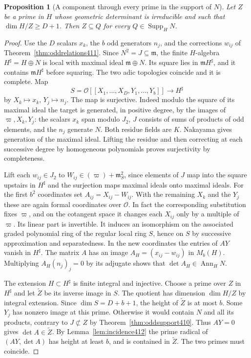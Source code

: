 \documentclass[a4paper,11pt]{article}
\newtheorem{proposition}{Proposition}[section]
\theoremstyle{definition}
\theoremstyle{remark}
\numberwithin{equation}{section}
\begin{document}
\begin{proposition}[A component through every prime in the support of \(N\)]\leavevmode
\label{prop:localcomponent412}
Let \(Z\) be a prime in \(H\) whose geometric determinant is
irreducible and such that \(\dim H/Z\ge D+1\). Then
\(Z\subseteq Q\) for every \(Q\in\operatorname{Supp}_H N\).
\end{proposition}
\begin{proof}
Use the \(D\) scalars \(x_k\), the \(b\) odd generators
\(n_j\), and the corrections \(w_{ij}\) of
Theorem~\ref{thm:oddrelations411}. Since \(N^2=J\subseteq
\mathfrak m\), the finite \(H\)-algebra \(H^\sharp=H\oplus N\)
is local with maximal ideal \(\mathfrak m\oplus N\). Its
square lies in \(\mathfrak m H^\sharp\), and it contains
\(\mathfrak m H^\sharp\) before squaring. The two adic
topologies coincide and it is complete. Map
\[
       S=\mathcal O[[X_1,\ldots,X_D,Y_1,\ldots,Y_b]]
                 \longrightarrow H^\sharp
\]
by \(X_k\mapsto x_k\), \(Y_j\mapsto n_j\). The map is
surjective. Indeed modulo the square of its maximal ideal
the target is generated, in positive degree, by the images
of \(\varpi,X_k,Y_j\): the scalars \(x_k\) span modulo
\(J_2\), \(J\) consists of sums of products of odd elements,
and the \(n_j\) generate \(N\). Both residue fields are
\(K\). Nakayama gives generation of the maximal ideal.
Lifting the residue and then correcting at each successive
degree by homogeneous polynomials proves surjectivity by
completeness.

Lift each \(w_{ij}\in J_2\) to
\(W_{ij}\in(\varpi)+\mathfrak m_S^2\), since elements of
\(J\) map into the square upstairs in \(H^\sharp\)
and the surjection maps maximal ideals onto maximal ideals.
For the first \(b^2\) coordinates set
\(A_{ij}=X_{ij}-W_{ij}\). With the remaining \(X_k\)
and the \(Y_j\) these are again formal coordinates over
\(\mathcal O\). In fact the corresponding substitution
fixes \(\varpi\), and on the cotangent space it changes
each \(X_{ij}\) only by a multiple of \(\varpi\).
Its linear part is invertible. It induces an isomorphism
on the associated graded polynomial ring of the regular
local ring \(S\), hence on \(S\) by successive approximation
and separatedness. In the new coordinates the entries of
\(AY\) vanish in \(H^\sharp\). The matrix \(A\) has an
image \(A_H=(x_{ij}-w_{ij})\) in \(M_b(H)\). Multiplying
\(A_H(n_j)_j=0\) by its adjugate shows that
\(\det A_H\in\operatorname{Ann}_H N\).

The extension \(H\subset H^\sharp\) is finite integral
and injective. Choose a prime over \(Z\) in \(H^\sharp\)
and let \(\widetilde Z\) be its inverse image in \(S\).
The quotient has dimension \(\dim H/Z\) by integral
extension. Since \(\dim S=D+b+1\), the height of
\(\widetilde Z\) is at most \(b\). Some \(Y_j\) has nonzero
image at this prime. Otherwise it would contain \(N\)
and all its products, contrary to \(J\not\subset Z\)
by Theorem~\ref{thm:oddsupport410}. Thus \(AY=0\) gives
\(\det A\in\widetilde Z\). By Lemma~\ref{lem:incidence412}
the prime radical of \((AY,\det A)\) has height at least
\(b\), and is contained in \(\widetilde Z\). The two
primes must coincide.


\end{proof}
\end{document}
